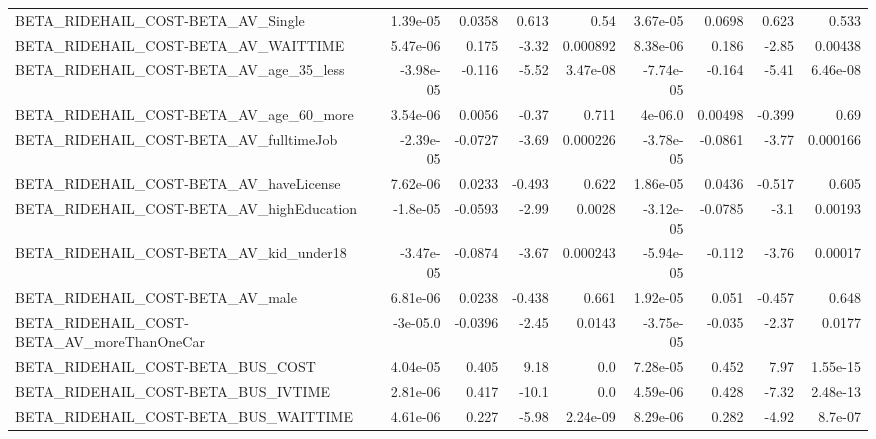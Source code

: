 \begin{tabular}{lrrrrrrrr}
BETA\_RIDEHAIL\_COST-BETA\_AV\_Single                  &    1.39e-05 &       0.0358 &     0.613 &     0.54 &   3.67e-05 &      0.0698 &        0.623 &         0.533 \\
BETA\_RIDEHAIL\_COST-BETA\_AV\_WAITTIME                &    5.47e-06 &        0.175 &     -3.32 & 0.000892 &   8.38e-06 &       0.186 &        -2.85 &       0.00438 \\
BETA\_RIDEHAIL\_COST-BETA\_AV\_age\_35\_less             &   -3.98e-05 &       -0.116 &     -5.52 & 3.47e-08 &  -7.74e-05 &      -0.164 &        -5.41 &      6.46e-08 \\
BETA\_RIDEHAIL\_COST-BETA\_AV\_age\_60\_more             &    3.54e-06 &       0.0056 &     -0.37 &    0.711 &    4e-06.0 &     0.00498 &       -0.399 &          0.69 \\
BETA\_RIDEHAIL\_COST-BETA\_AV\_fulltimeJob             &   -2.39e-05 &      -0.0727 &     -3.69 & 0.000226 &  -3.78e-05 &     -0.0861 &        -3.77 &      0.000166 \\
BETA\_RIDEHAIL\_COST-BETA\_AV\_haveLicense             &    7.62e-06 &       0.0233 &    -0.493 &    0.622 &   1.86e-05 &      0.0436 &       -0.517 &         0.605 \\
BETA\_RIDEHAIL\_COST-BETA\_AV\_highEducation           &    -1.8e-05 &      -0.0593 &     -2.99 &   0.0028 &  -3.12e-05 &     -0.0785 &         -3.1 &       0.00193 \\
BETA\_RIDEHAIL\_COST-BETA\_AV\_kid\_under18             &   -3.47e-05 &      -0.0874 &     -3.67 & 0.000243 &  -5.94e-05 &      -0.112 &        -3.76 &       0.00017 \\
BETA\_RIDEHAIL\_COST-BETA\_AV\_male                    &    6.81e-06 &       0.0238 &    -0.438 &    0.661 &   1.92e-05 &       0.051 &       -0.457 &         0.648 \\
BETA\_RIDEHAIL\_COST-BETA\_AV\_moreThanOneCar          &    -3e-05.0 &      -0.0396 &     -2.45 &   0.0143 &  -3.75e-05 &      -0.035 &        -2.37 &        0.0177 \\
BETA\_RIDEHAIL\_COST-BETA\_BUS\_COST                   &    4.04e-05 &        0.405 &      9.18 &      0.0 &   7.28e-05 &       0.452 &         7.97 &      1.55e-15 \\
BETA\_RIDEHAIL\_COST-BETA\_BUS\_IVTIME                 &    2.81e-06 &        0.417 &     -10.1 &      0.0 &   4.59e-06 &       0.428 &        -7.32 &      2.48e-13 \\
BETA\_RIDEHAIL\_COST-BETA\_BUS\_WAITTIME               &    4.61e-06 &        0.227 &     -5.98 & 2.24e-09 &   8.29e-06 &       0.282 &        -4.92 &       8.7e-07 \\

\end{tabular}
